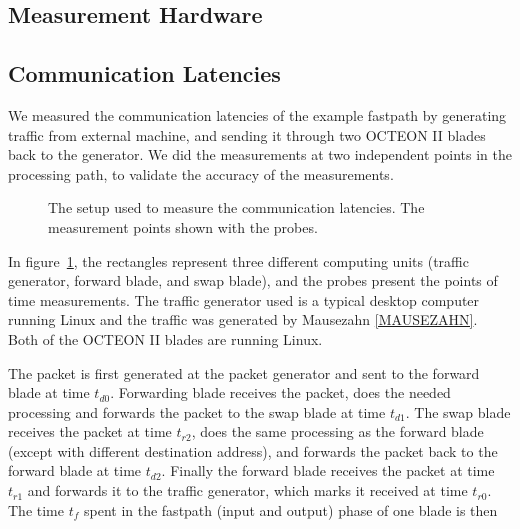 \subsection{Measurement Hardware}

\subsection{Communication Latencies}

We measured the communication latencies of the example fastpath by generating traffic from external machine, and sending it through two OCTEON II blades back to the generator. We did the measurements at two independent points in the processing path, to validate the accuracy of the measurements.

\begin{figure}[ht]
  \begin{center}
    
    \caption{The setup used to measure the communication latencies. The measurement points shown with the probes.}
    \label{fig:comm-setup}
  \end{center}
\end{figure}

In figure~\ref{fig:comm-setup}, the rectangles represent three different computing units (traffic generator, forward blade, and swap blade), and the probes present the points of time measurements. The traffic generator used is a typical desktop computer running Linux and the traffic was generated by Mausezahn \ref{MAUSEZAHN}. Both of the OCTEON II blades are running Linux.

The packet is first generated at the packet generator and sent to the forward blade at time $t_{d0}$. Forwarding blade receives the packet, does the needed processing and forwards the packet to the swap blade at time $t_{d1}$. The swap blade receives the packet at time $t_{r2}$, does the same processing as the forward blade (except with different destination address), and forwards the packet back to the forward blade at time $t_{d2}$. Finally the forward blade receives the packet at time $t_{r1}$ and forwards it to the traffic generator, which marks it received at time $t_{r0}$. The time $t_{f}$ spent in the fastpath (input and output) phase of one blade is then

